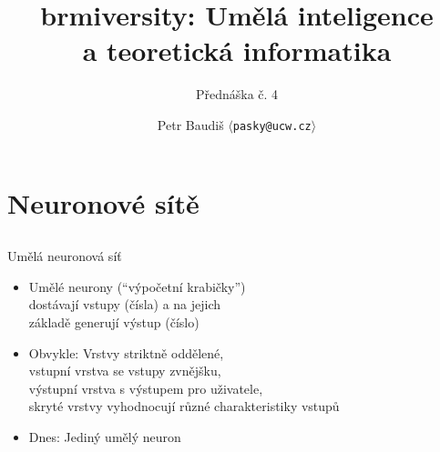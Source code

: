 \documentclass{beamer}
\begin{document}

\title{brmiversity: Umělá inteligence \\ a teoretická informatika}
\subtitle{Přednáška č. 4}
\author{Petr Baudiš $\langle${\tt pasky@ucw.cz}$\rangle$}
\date{}
\frame{\titlepage}

\section{Neuronové sítě}

\subsection{}
\begin{frame}{Umělá neuronová síť}
\begin{itemize}
\item Umělé neurony (``výpočetní krabičky'') \\ dostávají vstupy (čísla) a na jejich \\ základě generují výstup (číslo)
\item Obvykle: Vrstvy striktně oddělené, \\ vstupní vrstva se vstupy zvnějšku, \\ výstupní vrstva s výstupem pro uživatele, \\ skryté vrstvy vyhodnocují různé charakteristiky vstupů
\item Dnes: Jediný umělý neuron
\end{itemize}
\end{frame}
\end{document}
